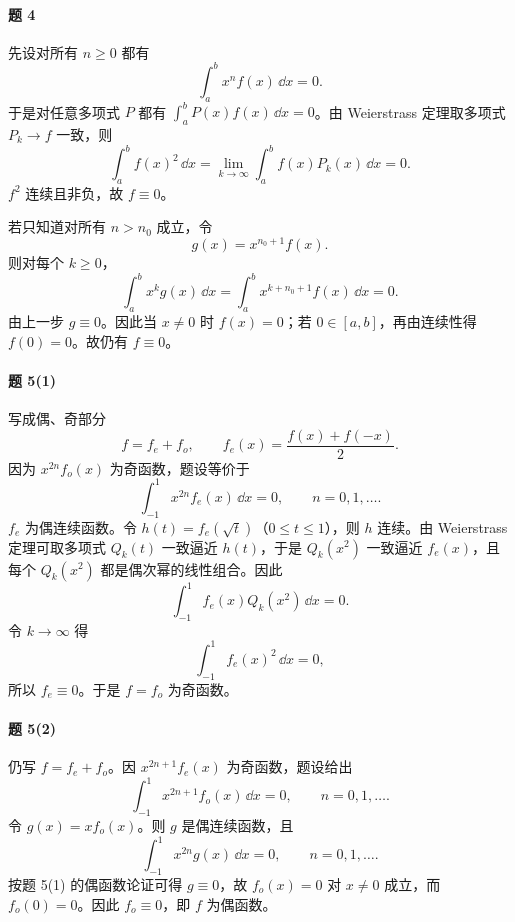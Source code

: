 \paragraph{题 4}
\begin{xsolution}
先设对所有 $n\geqslant0$ 都有
\[
  \int_a^bx^nf(x)\,\dd x=0.
\]
于是对任意多项式 $P$ 都有 $\int_a^bP(x)f(x)\,\dd x=0$。由 Weierstrass 定理取多项式 $P_k\to f$ 一致，则
\[
  \int_a^bf(x)^2\,\dd x
  =\lim_{k\to\infty}\int_a^bf(x)P_k(x)\,\dd x=0.
\]
$f^2$ 连续且非负，故 $f\equiv0$。

若只知道对所有 $n>n_0$ 成立，令
\[
  g(x)=x^{n_0+1}f(x).
\]
则对每个 $k\geqslant0$，
\[
  \int_a^bx^kg(x)\,\dd x
  =\int_a^bx^{k+n_0+1}f(x)\,\dd x=0.
\]
由上一步 $g\equiv0$。因此当 $x\ne0$ 时 $f(x)=0$；若 $0\in[a,b]$，再由连续性得 $f(0)=0$。故仍有 $f\equiv0$。
\end{xsolution}

\paragraph{题 5(1)}
\begin{xsolution}
写成偶、奇部分
\[
  f=f_e+f_o,
  \qquad
  f_e(x)=\frac{f(x)+f(-x)}2.
\]
因为 $x^{2n}f_o(x)$ 为奇函数，题设等价于
\[
  \int_{-1}^1x^{2n}f_e(x)\,\dd x=0,
  \qquad n=0,1,\ldots.
\]
$f_e$ 为偶连续函数。令 $h(t)=f_e(\sqrt t)$（$0\leqslant t\leqslant1$），则 $h$ 连续。由 Weierstrass 定理可取多项式 $Q_k(t)$ 一致逼近 $h(t)$，于是 $Q_k(x^2)$ 一致逼近 $f_e(x)$，且每个 $Q_k(x^2)$ 都是偶次幂的线性组合。因此
\[
  \int_{-1}^1f_e(x)Q_k(x^2)\,\dd x=0.
\]
令 $k\to\infty$ 得
\[
  \int_{-1}^1f_e(x)^2\,\dd x=0,
\]
所以 $f_e\equiv0$。于是 $f=f_o$ 为奇函数。
\end{xsolution}

\paragraph{题 5(2)}
\begin{xsolution}
仍写 $f=f_e+f_o$。因 $x^{2n+1}f_e(x)$ 为奇函数，题设给出
\[
  \int_{-1}^1x^{2n+1}f_o(x)\,\dd x=0,
  \qquad n=0,1,\ldots.
\]
令 $g(x)=xf_o(x)$。则 $g$ 是偶连续函数，且
\[
  \int_{-1}^1x^{2n}g(x)\,\dd x=0,
  \qquad n=0,1,\ldots.
\]
按题 5(1) 的偶函数论证可得 $g\equiv0$，故 $f_o(x)=0$ 对 $x\ne0$ 成立，而 $f_o(0)=0$。因此 $f_o\equiv0$，即 $f$ 为偶函数。
\end{xsolution}

